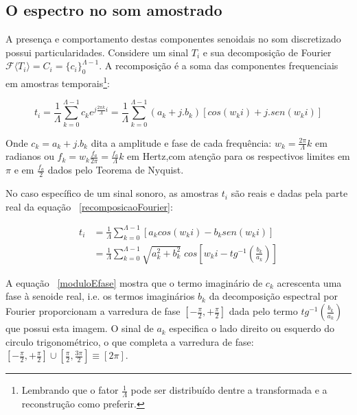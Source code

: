 \subsection{O espectro no som amostrado}
A presença e comportamento destas componentes senoidais 
no som discretizado possui particularidades. Considere um sinal $T_i$ e sua decomposição de Fourier $\mathcal{F}\langle T_i\rangle=C_i=\{c_i\}_0^{\Lambda-1}$. A recomposição é a soma das componentes frequenciais em amostras temporais\footnote{Lembrando que o fator $\frac{1}{\Lambda}$ pode ser distribuído dentre a transformada e a reconstrução como preferir.}:

 
\begin{equation}\label{recomposicaoFourier}
t_i = \frac{1}{\Lambda}\sum_{k=0}^{\Lambda-1}c_ke^{j \frac{2\pi k}{\Lambda} i } = \frac{1}{\Lambda}\sum_{k=0}^{\Lambda-1}(a_k+ j . b_k)\left[cos(w_k i) +j . sen(w_k i)\right]
\end{equation}

Onde $c_k = a_k + j . b_k$ dita a amplitude e fase de cada frequência: $w_k=\frac{2\pi}{\Lambda}k$ em radianos ou $f_k=w_k\frac{f_a}{2\pi}=\frac{f_a}{\Lambda}k$ em Hertz,com atenção para os respectivos limites em $\pi$ e em $\frac{f_a}{2}$ dados pelo Teorema de Nyquist. 

No caso específico de um sinal sonoro, as amostras $t_i$ são reais e dadas pela parte real da equação ~\ref{recomposicaoFourier}:

\begin{equation}\label{moduloEfase}
\begin{split}
t_i& = \frac{1}{\Lambda}\sum_{k=0}^{\Lambda-1}\left[a_k cos(w_k i) -b_k sen(w_k i)\right] \\
   & = \frac{1}{\Lambda}\sum_{k=0}^{\Lambda-1}\sqrt{a_k^2 + b_k^2} \; cos\left[w_k i - tg^{-1}\left(\frac{b_k}{a_k}\right)\right]
\end{split}
\end{equation}

A equação ~\ref{moduloEfase} mostra que o termo imaginário de $c_k$ acrescenta uma fase à senoide real, i.e. os termos imaginários $b_k$ da decomposição espectral por Fourier proporcionam a varredura de fase
 $\left[-\frac{\pi}{2},+\frac{\pi}{2}\right]$ dada pelo termo $tg^{-1}\left(\frac{b_k}{a_k}\right)$ que possui esta imagem. O sinal de $a_k$ especifica o lado direito ou esquerdo do circulo trigonométrico,  o que completa a varredura de fase: $\left[-\frac{\pi}{2},+\frac{\pi}{2}\right] \cup \left[\frac{\pi}{2},\frac{3\pi}{2}\right]\equiv [2\pi]$.



